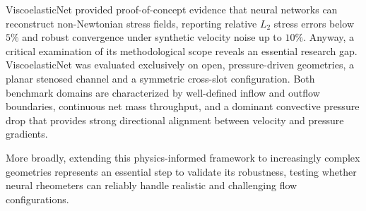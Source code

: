 ViscoelasticNet provided proof-of-concept evidence that neural
networks can reconstruct non-Newtonian stress fields, reporting relative $L_2$
stress errors below $5\%$ and robust convergence under synthetic velocity noise up
to $10\%$. Anyway, a critical examination of its methodological scope reveals
an essential research gap. ViscoelasticNet was evaluated exclusively on open,
pressure-driven geometries, a planar stenosed channel and a symmetric
cross-slot configuration. Both benchmark domains are characterized by well-defined
inflow and outflow boundaries, continuous net mass throughput, and a dominant
convective pressure drop that provides strong directional alignment between velocity
and pressure gradients.

More broadly, extending this physics-informed framework to increasingly complex geometries 
represents an essential step to validate its robustness, 
testing whether neural rheometers can reliably handle realistic and challenging flow configurations.